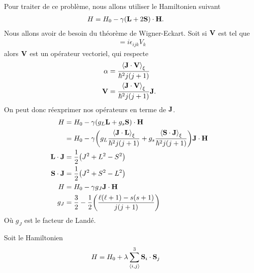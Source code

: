 Pour traiter de ce problème, nous allons utiliser le Hamiltonien suivant
\begin{align}
    H&=H_0-\gamma\qty(\vb{L}+2\vb{S})\cdot\vb{H}.
\end{align}
Nous allons avoir de besoin du théorème de Wigner-Eckart.
Soit si $\vb{V}$ est tel que
\begin{align}
    [J_i,V_i]&=i\epsilon_{ijk}V_k
\end{align}
alors $\vb{V}$ est un opérateur vectoriel, qui respecte
\begin{align}
    \alpha&=\frac{\expval{\vb{J}\cdot\vb{V}}_\xi}{\hbar^2 j(j+1)}\\
    \vb{V}&=\frac{\expval{\vb{J}\cdot\vb{V}}_\xi}{\hbar^2 j(j+1)}\vb{J}.
\end{align}
On peut donc réexprimer nos opérateurs en terme de $\vb{J}$.
\begin{align}
    H&=H_0-\gamma\qty(g_L\vb{L}+g_s\vb{S})\cdot\vb{H}\\
     &=H_0-\gamma\qty(g_L\frac{\expval{\vb{J}\cdot\vb{L}}_\xi}{\hbar^2 j(j+1)}
     +g_s\frac{\expval{\vb{S}\cdot\vb{J}}_\xi}{\hbar^2 j(j+1)})\vb{J}\cdot\vb{H}\\
    \vb{L}\cdot\vb{J}
     &=\frac12\qty(J^2+L^2-S^2)\\
    \vb{S}\cdot\vb{J}
     &=\frac12\qty(J^2+S^2-L^2)\\
    H&=H_0-\gamma g_J\vb{J}\cdot\vb{H}\\
    g_J&=\frac32-\frac12\qty(\frac{\ell(\ell+1)-s(s+1)}{j(j+1)})
\end{align}
Où $g_J$ est le facteur de Landé.

Soit le Hamiltonien
\begin{align}
    H&=H_0+\lambda\sum_{\expval{i,j}}^3\vb{S}_i\cdot\vb{S}_j
\end{align}


